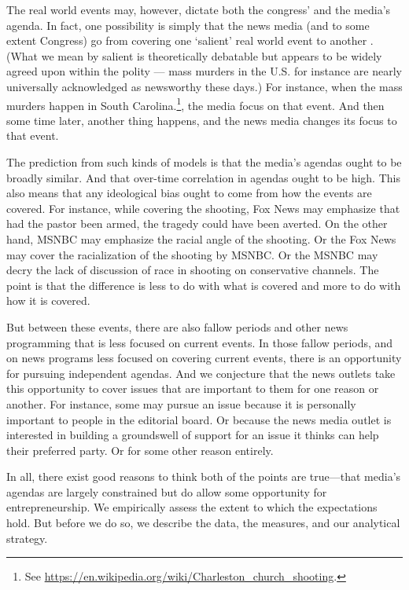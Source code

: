 \documentclass[12pt, letterpaper]{article}
\begin{document}
The real world events may, however, dictate both the congress' and the media's agenda. In fact, one possibility is simply that the news media (and to some extent Congress) go from covering one `salient' real world event to another \citep[]{boydstun2013making, birkland1998focusing}. (What we mean by salient is theoretically debatable but appears to be widely agreed upon within the polity --- mass murders in the U.S. for instance are nearly universally acknowledged as newsworthy these days.) For instance, when the mass murders happen in South Carolina.\footnote{See \href{https://en.wikipedia.org/wiki/Charleston_church_shooting}{https://en.wikipedia.org/wiki/Charleston\_church\_shooting}.}, the media focus on that event. And then some time later, another thing happens, and the news media changes its focus to that event. 

The prediction from such kinds of models is that the media's agendas ought to be broadly similar. And that over-time correlation in agendas ought to be high. This also means that any ideological bias ought to come from how the events are covered. For instance, while covering the shooting, Fox News may emphasize that had the pastor been armed, the tragedy could have been averted. On the other hand, MSNBC may emphasize the racial angle of the shooting. Or the Fox News may cover the racialization of the shooting by MSNBC. Or the MSNBC may decry the lack of discussion of race in shooting on conservative channels. The point is that the difference is less to do with what is covered and more to do with how it is covered. 

But between these events, there are also fallow periods and other news programming that is less focused on current events. In those fallow periods, and on news programs less focused on covering current events, there is an opportunity for pursuing independent agendas. And we conjecture that the news outlets take this opportunity to cover issues that are important to them for one reason or another. For instance, some may pursue an issue because it is personally important to people in the editorial board. Or because the news media outlet is interested in building a groundswell of support for an issue it thinks can help their preferred party. Or for some other reason entirely. 

In all, there exist good reasons to think both of the points are true---that media's agendas are largely constrained but do allow some opportunity for entrepreneurship. We empirically assess the extent to which the expectations hold. But before we do so, we describe the data, the measures, and our analytical strategy.
\end{document}
